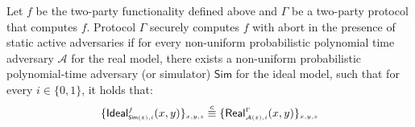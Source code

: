 \begin{definition}\label{def::MPC-active-adv}
Let $f$ be the two-party functionality defined above and $\Gamma$ be a two-party protocol that computes $f$.   Protocol $\Gamma$ securely computes $f$ with abort in the presence of static active adversaries if for every non-uniform probabilistic polynomial time adversary $\mathcal{A}$ for the real model, there exists a non-uniform probabilistic polynomial-time adversary (or simulator) $\mathsf{Sim}$ for the ideal model, such that for every $i\in \{0,1\}$, it holds that: 
%
\begin{equation*}
\{\mathsf {Ideal}^{\scriptscriptstyle f}_{\scriptscriptstyle \mathsf{Sim}(z), i}(x,y)\}_{\scriptscriptstyle x,y,z}\stackrel{c}{\equiv} \{\mathsf{Real}_{\scriptscriptstyle \mathcal{A}(z), i}^{\scriptscriptstyle \Gamma}(x,y) \}_{\scriptscriptstyle x,y,z}
\end{equation*}
%
\end{definition}
 
 
  
  